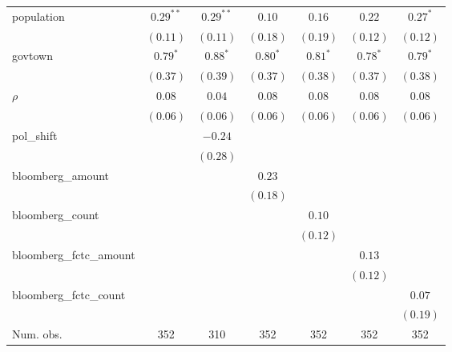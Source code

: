 \begin{table}[!h]
\begin{center}
\begin{tabular}{l c c c c c c }
population              & $0.29^{**}$  & $0.29^{**}$  & $0.10$       & $0.16$       & $0.22$       & $0.27^{*}$   \\
                        & $(0.11)$     & $(0.11)$     & $(0.18)$     & $(0.19)$     & $(0.12)$     & $(0.12)$     \\
govtown                 & $0.79^{*}$   & $0.88^{*}$   & $0.80^{*}$   & $0.81^{*}$   & $0.78^{*}$   & $0.79^{*}$   \\
                        & $(0.37)$     & $(0.39)$     & $(0.37)$     & $(0.38)$     & $(0.37)$     & $(0.38)$     \\
$\rho$                  & $0.08$       & $0.04$       & $0.08$       & $0.08$       & $0.08$       & $0.08$       \\
                        & $(0.06)$     & $(0.06)$     & $(0.06)$     & $(0.06)$     & $(0.06)$     & $(0.06)$     \\
pol\_shift              &              & $-0.24$      &              &              &              &              \\
                        &              & $(0.28)$     &              &              &              &              \\
bloomberg\_amount       &              &              & $0.23$       &              &              &              \\
                        &              &              & $(0.18)$     &              &              &              \\
bloomberg\_count        &              &              &              & $0.10$       &              &              \\
                        &              &              &              & $(0.12)$     &              &              \\
bloomberg\_fctc\_amount &              &              &              &              & $0.13$       &              \\
                        &              &              &              &              & $(0.12)$     &              \\
bloomberg\_fctc\_count  &              &              &              &              &              & $0.07$       \\
                        &              &              &              &              &              & $(0.19)$     \\
\midrule
Num. obs.               & 352          & 310          & 352          & 352          & 352          & 352          \\

\end{tabular}
\end{center}
\end{table}
